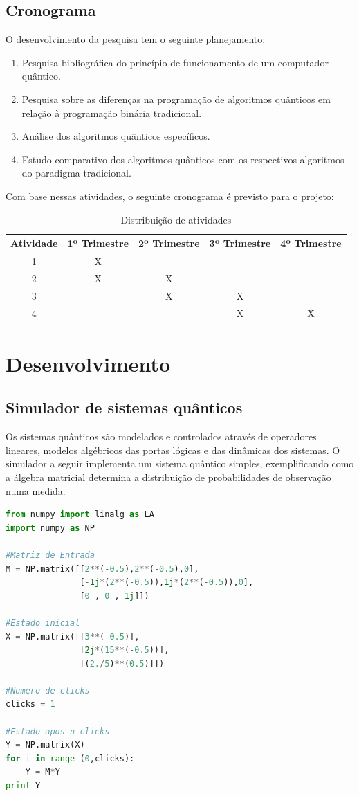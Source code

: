 \documentclass[pfc]{imetex}
\begin{document}
\section{Cronograma}
O desenvolvimento da pesquisa tem o seguinte planejamento:
\begin{enumerate}
\item Pesquisa bibliográfica do princípio de funcionamento de um computador quântico.
\item Pesquisa sobre as diferenças na programação de algoritmos quânticos em relação à programação binária tradicional.
\item Análise dos algoritmos quânticos específicos.
\item Estudo comparativo dos algoritmos quânticos com os respectivos algoritmos do paradigma tradicional.
\end{enumerate}
Com base nessas atividades, o seguinte cronograma é previsto para o projeto:
\begin{table}[h]
\centering
\begin{tabular}{|c|c|c|c|c|}
\hline 
Atividade & 1º Trimestre & 2º Trimestre & 3º Trimestre & 4º Trimestre \\ 
\hline 
1 & X &   &   &   \\ 
\hline 
2 & X & X &   &   \\ 
\hline 
3 &   & X & X &   \\ 
\hline 
4 &   &   & X & X \\ 
\hline 
\end{tabular}
\caption{Distribuição de atividades}
\end{table}

\chapter{Desenvolvimento}
\section{Simulador de sistemas quânticos}
Os sistemas quânticos são modelados e controlados através de operadores lineares, modelos algébricos das portas lógicas e das dinâmicas dos sistemas. O simulador a seguir implementa um sistema quântico simples, exemplificando como a álgebra matricial determina a distribuição de probabilidades de observação numa medida.
\begin{lstlisting}[language=Python, caption={Simulador quântico básico}, label=simuladorqb]
from numpy import linalg as LA
import numpy as NP

#Matriz de Entrada
M = NP.matrix([[2**(-0.5),2**(-0.5),0],
               [-1j*(2**(-0.5)),1j*(2**(-0.5)),0],
               [0 , 0 , 1j]])

#Estado inicial
X = NP.matrix([[3**(-0.5)],
               [2j*(15**(-0.5))],
               [(2./5)**(0.5)]])

#Numero de clicks
clicks = 1

#Estado apos n clicks
Y = NP.matrix(X)
for i in range (0,clicks):
    Y = M*Y
print Y
\end{lstlisting}
\end{document}
